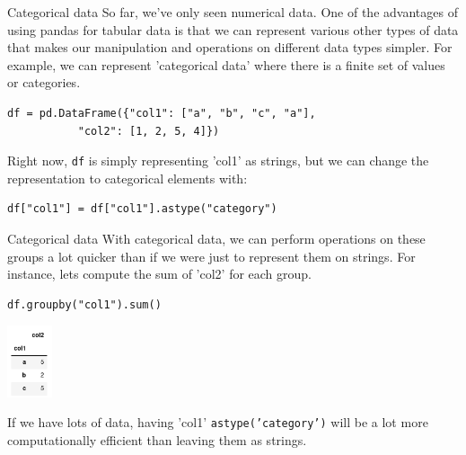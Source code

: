 \documentclass[10pt]{beamer}
\begin{document}
\begin{frame}[label={sec:org0184a77},fragile]{Categorical data}
 So far, we've only seen numerical data. One of the advantages of using pandas
for tabular data is that we can represent various other types of data that makes
our manipulation and operations on different data types simpler. For example, we
can represent 'categorical data' where there is a finite set of values or
categories.

\begin{verbatim}
df = pd.DataFrame({"col1": ["a", "b", "c", "a"],
		   "col2": [1, 2, 5, 4]})
\end{verbatim}

Right now, \texttt{df} is simply representing 'col1' as strings, but we can change the
representation to categorical elements with:

\begin{verbatim}
df["col1"] = df["col1"].astype("category")
\end{verbatim}
\end{frame}


\begin{frame}[label={sec:org7496350},fragile]{Categorical data}
 With categorical data, we can perform operations on these groups a lot quicker
than if we were just to represent them on strings. For instance, lets compute
the sum of 'col2' for each group.

\begin{verbatim}
df.groupby("col1").sum()
\end{verbatim}

\begin{center}
\includegraphics[width=0.1\textwidth]{images/categorical.png}
\end{center}

If we have lots of data, having 'col1' \texttt{astype('category')} will be a lot more
computationally efficient than leaving them as strings.
\end{frame}
\end{document}

